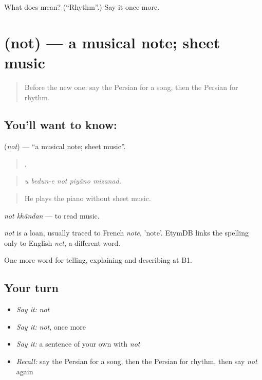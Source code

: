 \begin{tcolorbox}[breakable,colback=teal!4,colframe=teal!35!black,title={Before you move on}]
What does  mean? (\textquotedblleft{}Rhythm\textquotedblright{}.) Say it once more.
\end{tcolorbox}
\section[\texorpdfstring{\fa{نت} (not)}{نت (not)}]{ (not) — a musical note; sheet music}

\label{lesson:FA-C519-not}



\begin{quote}
Before the new one: say the Persian for a song, then the Persian for rhythm.
\end{quote}

\subsection*{You'll want to know: }
\textbf{} (\emph{not}) — \textquotedblleft{}a musical note; sheet music\textquotedblright{}.

\begin{quote}
    .
\end{quote}

\begin{quote}
\emph{u bedun-e not piyâno mizanad.}
\end{quote}

\begin{quote}
He plays the piano without sheet music.
\end{quote}

\emph{not khândan} — to read music.

\begin{cousinweb}
\emph{not} is a loan, usually traced to French \emph{note}, 'note'. EtymDB links the spelling only to English \emph{net}, a different word.
\end{cousinweb}

\begin{grammarlens}[title={What you've built}]
One more word for telling, explaining and describing at B1.
\end{grammarlens}

\subsection*{Your turn}
\begin{itemize}
\raggedright
  \item \emph{Say it:} \emph{not}
  \item \emph{Say it:} \emph{not}, once more
  \item \emph{Say it:} a sentence of your own with \emph{not}
  \item \emph{Recall:} say the Persian for a song, then the Persian for rhythm, then say \emph{not} again
\end{itemize}

